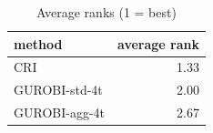 \begin{table}[htbp]
\centering
\small
\caption{Average ranks (1 = best)}
\label{tab:E7_gurobi_threads_b60_ranks}
\begin{tabular}{lr}
\toprule
method & average rank \\
\midrule
CRI & 1.33 \\
GUROBI-std-4t & 2.00 \\
GUROBI-agg-4t & 2.67 \\
\bottomrule
\end{tabular}
\end{table}
